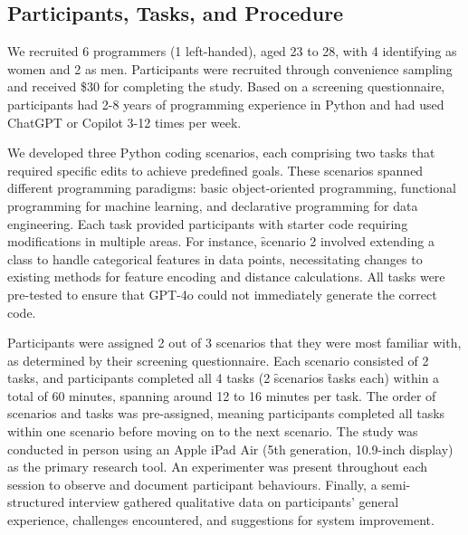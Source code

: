 \subsection{Participants, Tasks, and Procedure}
We recruited 6 programmers (1 left-handed), aged 23 to 28, with 4 identifying as women and 2 as men.
Participants were recruited through convenience sampling and received \$30 for completing the study. Based on a screening questionnaire, participants had 2-8 years of programming experience in Python and had used ChatGPT or Copilot 3-12 times per week.

We developed three Python coding scenarios, each comprising two tasks that required specific edits to achieve predefined goals. These scenarios spanned different programming paradigms: basic object-oriented programming, functional programming for machine learning, and declarative programming for data engineering. Each task provided participants with starter code requiring modifications in multiple areas. For instance, \f{scenario 2} involved extending a class to handle categorical features in data points, necessitating changes to existing methods for feature encoding and distance calculations. All tasks were pre-tested to ensure that GPT-4o could not immediately generate the correct code.

Participants were assigned 2 out of 3 scenarios that they were most familiar with, as determined by their screening questionnaire. Each scenario consisted of 2 tasks, and participants completed all 4 tasks (2 \f{scenarios}  \f{tasks} each) within a total of 60 minutes, spanning around 12 to 16 minutes per task. The order of scenarios and tasks was pre-assigned, meaning participants completed all tasks within one scenario before moving on to the next scenario. 
The study was conducted in person using an Apple iPad Air (5th generation, 10.9-inch display) as the primary research tool. An experimenter was present throughout each session to observe and document participant behaviours.
Finally, a semi-structured interview gathered qualitative data on participants' general experience, challenges encountered, and suggestions for system improvement.

